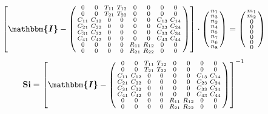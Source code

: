 \[ \left[ \boldsymbol{\mathbbm{I}}  - \left(\begin{smallmatrix} 0 & 0
& T_{11} & T_{12} & 0 & 0 & 0 & 0 \\ 0 & 0 & T_{21} & T_{22} & 0 & 0 &
0 & 0 \\ C_{11} & C_{12} & 0 & 0 & 0 & 0 & C_{13} & C_{14} \\ C_{21} &
C_{22} & 0 & 0 & 0 & 0 & C_{23} & C_{24} \\ C_{31} & C_{32} & 0 & 0 &
0 & 0 & C_{33} & C_{34} \\ C_{41} & C_{42} & 0 & 0 & 0 & 0 & C_{43} &
C_{44} \\ 0 & 0 & 0 & 0 & R_{11} & R_{12} & 0 & 0 \\ 0 & 0 & 0 & 0 &
R_{21} & R_{22} & 0 & 0 \end{smallmatrix}\right)\right] \cdot
\left(\begin{smallmatrix} n_{1} \\ n_{3} \\ n_{2} \\ n_{4} \\ n_{5} \\
n_{7} \\ n_{6} \\ n_{8} \end{smallmatrix}\right) =
\left(\begin{smallmatrix} m_{1} \\ m_{2} \\ 0 \\ 0 \\ 0 \\ 0 \\ 0 \\ 0
\end{smallmatrix}\right) \]
\[ \mathbf{Si} = \left[ \boldsymbol{\mathbbm{I}}  -
\left(\begin{smallmatrix} 0 & 0 & T_{11} & T_{12} & 0 & 0 & 0 & 0 \\ 0
& 0 & T_{21} & T_{22} & 0 & 0 & 0 & 0 \\ C_{11} & C_{12} & 0 & 0 & 0 &
0 & C_{13} & C_{14} \\ C_{21} & C_{22} & 0 & 0 & 0 & 0 & C_{23} &
C_{24} \\ C_{31} & C_{32} & 0 & 0 & 0 & 0 & C_{33} & C_{34} \\ C_{41}
& C_{42} & 0 & 0 & 0 & 0 & C_{43} & C_{44} \\ 0 & 0 & 0 & 0 & R_{11} &
R_{12} & 0 & 0 \\ 0 & 0 & 0 & 0 & R_{21} & R_{22} & 0 & 0
\end{smallmatrix}\right) \right]^{-1} \]
